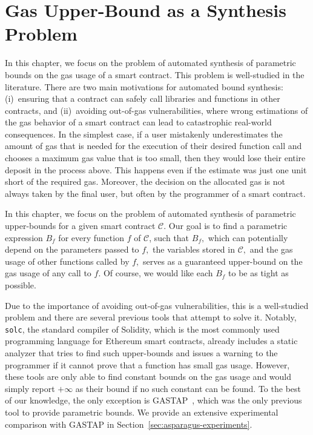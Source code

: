 \section{Gas Upper-Bound as a Synthesis Problem}\label{sec:asparagus-problem} 

 In this chapter, we focus on the problem of automated synthesis of parametric bounds on the gas usage of a smart contract. This problem is well-studied in the literature. There are two main motivations for automated bound synthesis: (i)~ensuring that a contract can safely call libraries and functions in other contracts, and (ii)~avoiding out-of-gas vulnerabilities, where wrong estimations of the gas behavior of a smart contract can lead to catastrophic real-world consequences. In the simplest case, if a user mistakenly underestimates the amount of gas that is needed for the execution of their desired function call and chooses a maximum gas value that is too small, then they would lose their entire deposit in the process above. This happens even if the estimate was just one unit short of the required gas. Moreover, the decision on the allocated gas is not always taken by the final user, but often by the programmer of a smart contract.

 In this chapter, we focus on the problem of automated synthesis of parametric upper-bounds for a given smart contract $\mathscr{C}$. Our goal is to find a parametric expression $B_f$ for every function $f$ of $\mathscr{C}$, such that $B_f,$ which can potentially depend on the parameters passed to $f,$ the variables stored in $\mathscr{C},$ and the gas usage of other functions called by $f,$ serves as a guaranteed upper-bound on the gas usage of any call to $f.$ Of course, we would like each $B_f$ to be as tight as possible.

 Due to the importance of avoiding out-of-gas vulnerabilities, this is a well-studied problem and there are several previous tools that attempt to solve it. Notably, \texttt{solc}, the standard compiler of Solidity, which is the most commonly used programming language for Ethereum smart contracts, already includes a static analyzer that tries to find such upper-bounds and issues a warning to the programmer if it cannot prove that a function has small gas usage. However, these tools are only able to find constant bounds on the gas usage and would simply report $+\infty$ as their bound if no such constant can be found. To the best of our knowledge, the only exception is GASTAP~\cite{albert2021don1}, which was the only previous tool to provide parametric bounds. We provide an extensive experimental comparison with GASTAP in Section~\ref{sec:asparagus-experiments}.

